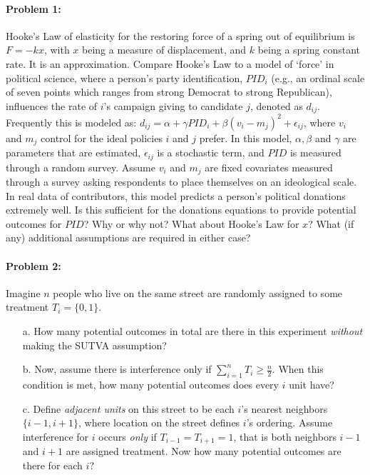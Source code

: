 \documentclass{article}
\begin{document}
\paragraph{Problem 1:}
Hooke's Law of elasticity for the restoring force of a spring out of
equilibrium is $F=-kx$, with $x$ being a measure of displacement, and
$k$ being a spring constant rate.  It is an approximation. Compare
Hooke's Law to a model of `force' in political science, where a
person's party identification, $PID_i$ (e.g., an ordinal scale of
seven points which ranges from strong Democrat to strong Republican),
influences the rate of $i$'s campaign giving to candidate $j$, denoted
as $d_{ij}$.  Frequently this is modeled as: $d_{ij}=\alpha+\gamma
PID_i+\beta(v_i-m_j)^2 + \epsilon_{ij}$, where $v_i$ and $m_j$ control
for the ideal policies $i$ and $j$ prefer.  In this model, $\alpha,
\beta$ and $\gamma$ are parameters that are estimated, $\epsilon_{ij}$
is a stochastic term, and $PID$ is measured through a random survey.
Assume $v_i$ and $m_j$ are fixed covariates measured through a survey
asking respondents to place themselves on an ideological scale.  In
real data of contributors, this model predicts a person's political
donations extremely well.  Is this sufficient for the donations
equations to provide potential outcomes for $PID$?  Why or why not?
What about Hooke's Law for $x$? What (if any) additional assumptions
are required in either case?

\paragraph{Problem 2:}

Imagine $n$ people who live on the same street are randomly assigned
to some treatment $T_i=\{0,1\}$. 
\begin{itemize}
\item[a.] How many potential outcomes in total are there in this
  experiment {\em without} making the SUTVA assumption?  

\item[b.] Now, assume there is
interference only if $\sum_{i=1}^n T_i \geq \frac{n}{2}$. When this
condition is met, how many potential outcomes does every $i$
unit have? 

\item[c.] Define {\em adjacent units} on this street to be each $i$'s
  nearest neighbors $\{i-1,i+1\}$, where location on the street
  defines $i$'s ordering. Assume interference for $i$ occurs {\em only
  } if $T_{i-1}=T_{i+1}=1$, that is both neighbors $i-1$ and $i+1$ are
  assigned treatment. Now how many potential outcomes are there for
  each $i$?
\end{itemize}
\end{document}
